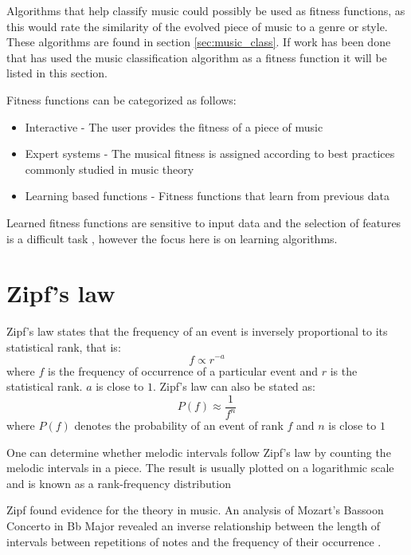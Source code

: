 
Algorithms that help classify music could possibly be used as fitness functions, as this would rate the similarity of the evolved piece of music to a genre or style. These algorithms are found in section \ref{sec:music_class}.
If work has been done that has used the music classification algorithm as a fitness function it will be listed in this section.

Fitness functions can be categorized as follows:
\begin{itemize}
\item Interactive - The user provides the fitness of a piece of music
\item Expert systems - The musical fitness is assigned according to best practices commonly studied in music theory
\item Learning based functions - Fitness functions that learn from previous data
\end{itemize}

Learned fitness functions are sensitive to input data and the selection of features is a difficult task \cite{Dostal2013}, however the focus here is on learning algorithms.


\section{Zipf's law} \label{sec:zipfs_fitness}
Zipf's law states that the frequency of an event is inversely proportional to its statistical rank, that is:
\[ f \propto r^{-a} \]
where $f$ is the frequency of occurrence of a particular event and $r$ is the statistical rank. $a$ is close to $1$.
Zipf's law can also be stated as:
\[ P(f) \approx \frac{1}{f^n}\]
where $P(f)$ denotes the probability of an event of rank $f$ and $n$ is close to $1$

One can determine whether melodic intervals follow Zipf's law by counting the melodic intervals in a piece. The result is usually plotted on a logarithmic scale and is known as a rank-frequency distribution

Zipf found evidence for the theory in music. An analysis of Mozart's Bassoon Concerto in Bb Major revealed an inverse relationship between the length of intervals between repetitions of notes and the frequency of their occurrence \cite{zipf1949human}.


